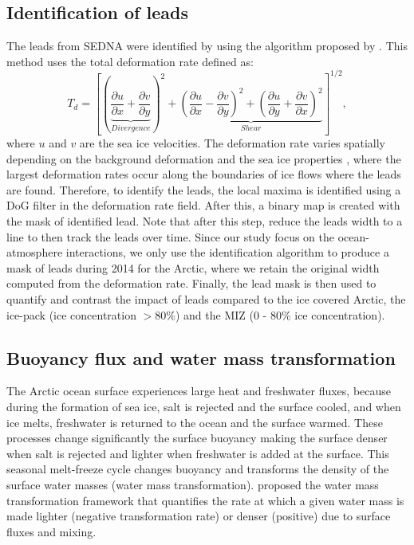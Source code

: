 \documentclass[lineno,sn-basic]{sn-jnl}%
\begin{document}
\subsection*{Identification of leads}

The leads from SEDNA were identified by using the algorithm proposed by \citet{Hutter_identification_2019}. This method uses the total deformation rate defined as: 
\begin{equation}
    T_d = \left[\left(\underbrace{\frac{\partial u}{\partial x} +\frac{\partial v}{\partial y}}_{Divergence}\right)^2 + \underbrace{\left(\frac{\partial u}{\partial x} - \frac{\partial v}{\partial y}\right)^2+ \left(\frac{\partial u}{\partial y} + \frac{\partial v}{\partial x}\right)^2}_{Shear}\right]^{1/2},
\end{equation}
where $u$ and $v$ are the sea ice velocities. The deformation rate varies spatially depending on the background deformation and the sea ice properties \citep{Reiser_LKF_2020}, where the largest deformation rates occur along the boundaries of ice flows where the leads are found. Therefore, to identify the leads, the local maxima is identified using a DoG filter in the deformation rate field. After this, a binary map is created with the mask of identified lead. Note that after this step, \citet{Hutter_identification_2019} reduce the leads width to a line to then track the leads over time. Since our study focus on the ocean-atmosphere interactions, we only use the identification algorithm to produce a mask of leads during 2014 for the Arctic, where we retain the original width computed from the deformation rate. Finally, the lead mask is then used to quantify and contrast the impact of leads compared to the ice covered Arctic, the ice-pack (ice concentration $> 80\%$) and the MIZ (0 - 80\% ice concentration).

\subsection*{Buoyancy flux and water mass transformation}
 
The Arctic ocean surface experiences large heat and freshwater fluxes, because during the formation of sea ice, salt is rejected and the surface cooled, and when ice melts, freshwater is returned to the ocean and the surface warmed. 
These processes change significantly the surface buoyancy making the surface denser when salt is rejected and lighter when freshwater is added at the surface. This seasonal melt-freeze cycle changes buoyancy and transforms the density of the surface water masses (water mass transformation). \citet{Walin_WMT_1982} proposed the water mass transformation framework that quantifies the rate at which a given water mass is made lighter (negative transformation rate) or denser (positive) due to surface fluxes and mixing. 
\end{document}
